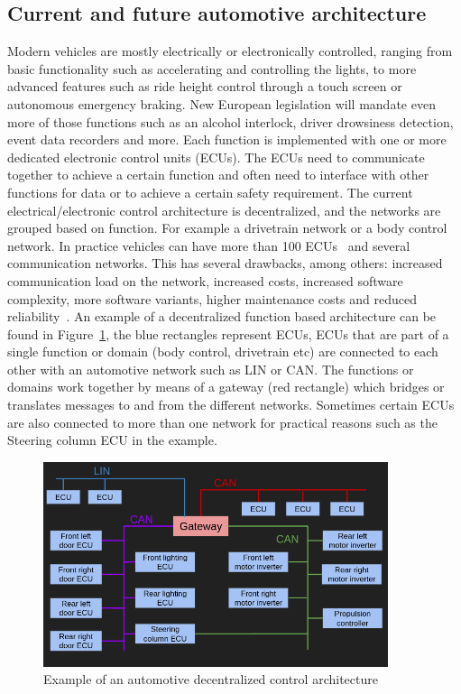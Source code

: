 \subsection{Current and future automotive architecture}
\label{sec:architectures}
Modern vehicles are mostly electrically or electronically controlled, ranging from basic functionality such as accelerating and controlling the lights, to more advanced features such as ride height control through a touch screen or autonomous emergency braking. New European legislation will mandate even more of those functions such as an alcohol interlock, driver drowsiness detection, event data recorders and more. Each function is implemented with one or more dedicated electronic control units (ECUs). The ECUs need to communicate together to achieve a certain function and often need to interface with other functions for data or to achieve a certain safety requirement. The current electrical/electronic control architecture is decentralized, and the networks are grouped based on function. For example a drivetrain network or a body control network. In practice vehicles can have more than 100 ECUs~\cite{bandur2021making} and several communication networks. This has several drawbacks, among others: increased communication load on the network, increased costs, increased software complexity, more software variants, higher maintenance costs and reduced reliability~\cite{bandur2021making}. An example of a decentralized function based architecture can be found in Figure~\ref{fig:functional-arch}, the blue rectangles represent ECUs, ECUs that are part of a single function or domain (body control, drivetrain etc) are connected to each other with an automotive network such as LIN or CAN. The functions or domains work together by means of a gateway (red rectangle) which bridges or translates messages to and from the different networks. Sometimes certain ECUs are also connected to more than one network for practical reasons such as the Steering column ECU in the example.

\begin{figure}[htb]
    \centering
    \includegraphics[width=0.9\textwidth]{images/functional-arch.png}
    \caption{Example of an automotive decentralized control architecture}
    \label{fig:functional-arch}
\end{figure}

